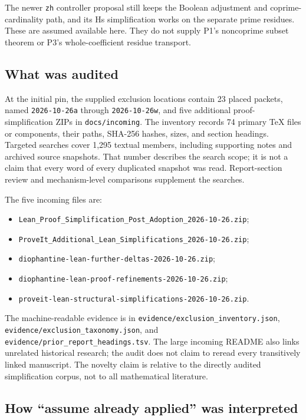 \documentclass[11pt,letterpaper]{article}
\newcommand{\artifact}[1]{\nolinkurl{#1}}
\begin{document}
The newer \texttt{zh} controller proposal still keeps the Boolean adjustment
and coprime-cardinality path, and its Hs simplification works on the separate
prime residues. These are assumed available here. They do not supply P1's
noncoprime subset theorem or P3's whole-coefficient residue transport.

\subsection{What was audited}

At the initial pin, the supplied exclusion locations contain 23 placed packets, named
\texttt{2026-10-26a} through \texttt{2026-10-26w}, and five additional
proof-simplification ZIPs in \texttt{docs/incoming}. The inventory records
74 primary TeX files or components, their paths, SHA-256 hashes, sizes, and
section headings. Targeted searches cover 1,295 textual members, including
supporting notes and archived source snapshots. That number describes the
search scope; it is not a claim that every word of every duplicated snapshot
was read. Report-section review and mechanism-level comparisons supplement
the searches.

The five incoming files are:
\begin{itemize}
\item \artifact{Lean_Proof_Simplification_Post_Adoption_2026-10-26.zip};
\item \artifact{ProveIt_Additional_Lean_Simplifications_2026-10-26.zip};
\item \artifact{diophantine-lean-further-deltas-2026-10-26.zip};
\item \artifact{diophantine-lean-proof-refinements-2026-10-26.zip};
\item \artifact{proveit-lean-structural-simplifications-2026-10-26.zip}.
\end{itemize}

The machine-readable evidence is in \artifact{evidence/exclusion_inventory.json},
\artifact{evidence/exclusion_taxonomy.json}, and
\artifact{evidence/prior_report_headings.tsv}. The large incoming README also
links unrelated historical research; the audit does not claim to reread every
transitively linked manuscript. The novelty claim is relative to the directly
audited simplification corpus, not to all mathematical literature.

\subsection{How ``assume already applied'' was interpreted}
\end{document}
